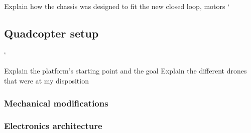 \documentclass[11pt]{article}
\begin{document}
            \begin{figure}[H]
                \centering 
            \end{figure}


            Explain how the chassis was designed to fit the new closed loop, motors
`
        \subsection{Quadcopter setup}`
                
                Explain the platform's starting point and the goal
                Explain the different drones that were at my disposition
                \subsubsection{Mechanical modifications}
    
                \subsubsection{Electronics architecture}
    
\end{document}
